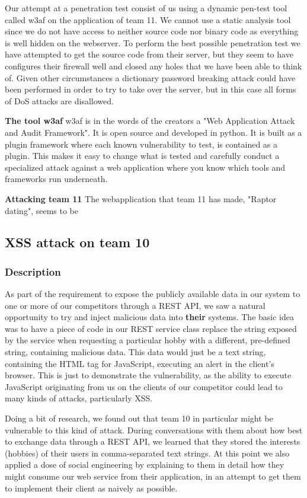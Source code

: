 \documentclass[a4paper]{article}
\begin{document}
Our attempt at a penetration test consist of us using a dynamic pen-test tool called w3af on the application of team 11.
We cannot use a static analysis tool since we do not have access to neither source code nor binary code as everything is well hidden on the webserver. To perform the best possible penetration test we have attempted to get the source code from their server, but they seem to have configures their firewall well and closed any holes that we have been able to think of. Given other circumstances a dictionary password breaking attack could have been performed in order to try to take over the server, but in this case all forms of DoS attacks are disallowed.

\textbf{The tool w3af}
w3af is in the words of the creators a "Web Application Attack and Audit Framework". It is open source and developed in python. It is built as a plugin framework where each known vulnerability to test, is contained as a plugin. This makes it easy to change what is tested and carefully conduct a specialized attack against a web application where you know which tools and frameworks run underneath.


\textbf{Attacking team 11}
The webapplication that team 11 has made, "Raptor dating", seems to be

\subsection{XSS attack on team 10}
\subsubsection{Description}
As part of the requirement to expose the publicly available data in our system to one or more of our competitors through a REST API, we saw a natural opportunity to try and inject malicious data into \textbf{their} systems. The basic idea was to have a piece of code in our REST service class replace the string exposed by the service when requesting a particular hobby with a different, pre-defined string, containing malicious data. This data would just be a text string, containing the HTML tag for JavaScript, executing an alert in the client's browser. This is just to demonstrate the vulnerability, as the ability to execute JavaScript originating from us on the clients of our competitor could lead to many kinds of attacks, particularly XSS.

Doing a bit of research, we found out that team 10 in particular might be vulnerable to this kind of attack. During conversations with them about how best to exchange data through a REST API, we learned that they stored the interests (hobbies) of their users in comma-separated text strings. At this point we also applied a dose of social engineering by explaining to them in detail how they might consume our web service from their application, in an attempt to get them to implement their client as naively as possible.
\end{document}
